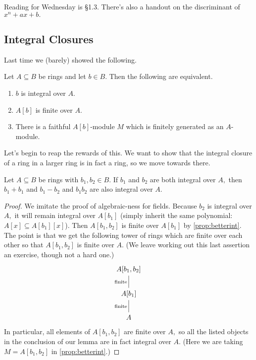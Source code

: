 










Reading for Wednesday is \S1.3. There's also a handout on the discriminant of $x^n+ax+b.$

\subsection{Integral Closures}
Last time we (barely) showed the following.
\begin{prop} \label{prop:betterint}
    Let $A\subseteq B$ be rings and let $b\in B.$ Then the following are equivalent.
    \begin{enumerate}[label=(\alph*)]
        \item $b$ is integral over $A.$
        \item $A[b]$ is finite over $A.$
        \item There is a faithful $A[b]$-module $M$ which is finitely generated as an $A$-module.
    \end{enumerate}
\end{prop}
Let's begin to reap the rewards of this. We want to show that the integral closure of a ring in a larger ring is in fact a ring, so we move towards there.
\begin{lem}
    Let $A\subseteq B$ be rings with $b_1,b_2\in B.$ If $b_1$ and $b_2$ are both integral over $A,$ then $b_1+b_1$ and $b_1-b_2$ and $b_1b_2$ are also integral over $A.$
\end{lem}
\begin{proof}
    We imitate the proof of algebraic-ness for fields. Because $b_2$ is integral over $A,$ it will remain integral over $A[b_1]$ (simply inherit the same polynomial: $A[x]\subseteq A[b_1][x]$). Then $A[b_1,b_2]$ is finite over $A[b_1]$ by \autoref{prop:betterint}. The point is that we get the following tower of rings which are finite over each other so that $A[b_1,b_2]$ is finite over $A.$ (We leave working out this last assertion an exercise, though not a hard one.)
    \[\begin{tikzcd}
    	{A[b_1,b_2]} \\
    	{A[b_1]} \\
    	A
    	\arrow["{\text{finite}}", no head, from=3-1, to=2-1]
    	\arrow["{\text{finite}}", no head, from=2-1, to=1-1]
    \end{tikzcd}\]
    In particular, all elements of $A[b_1,b_2]$ are finite over $A,$ so all the listed objects in the conclusion of our lemma are in fact integral over $A.$ (Here we are taking $M=A[b_1,b_2]$ in \autoref{prop:betterint}.)
\end{proof}

